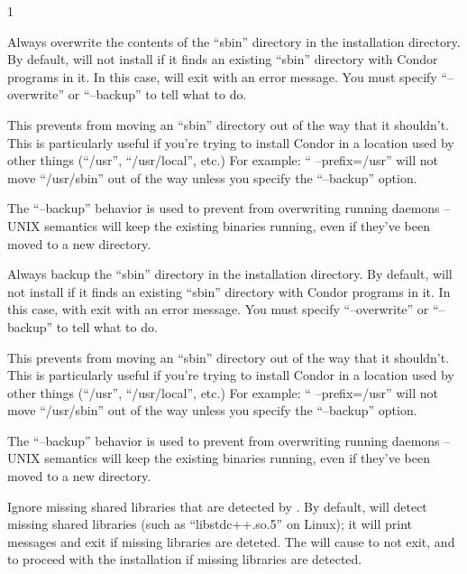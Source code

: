 \begin{ManPage}{\label{man-condor-configure}}{1}
\begin{Options}
	 {
	  Always overwrite the contents of the ``sbin'' directory in
	  the installation directory.  By default, 
	  will not install if it finds an existing ``sbin'' directory
	  with Condor programs in it.  In this case, 
	  will exit with an error message.  You must specify
	  ``--overwrite'' or ``--backup'' to tell 
	  what to do.

	  This prevents  from moving an ``sbin''
	  directory out of the way that it shouldn't.  This is
	  particularly useful if you're trying to install Condor in a
	  location used by other things (``/usr'', ``/usr/local'', etc.)
	  For example: `` --prefix=/usr'' will not move
	  ``/usr/sbin'' out of the way unless you specify the
	  ``--backup'' option.

	  The ``--backup'' behavior is used to
	  prevent  from overwriting running daemons --
	  UNIX semantics will keep the existing binaries running, even
	  if they've been moved to a new directory.}

	 {
	  Always backup the ``sbin'' directory in the installation
	  directory.  By default,  will not install if
	  it finds an existing ``sbin'' directory with Condor programs
	  in it.  In this case,  with exit with an
	  error message.  You must specify ``--overwrite'' or
	  ``--backup'' to tell  what to do.

	  This prevents  from moving an ``sbin''
	  directory out of the way that it shouldn't.  This is
	  particularly useful if you're trying to install Condor in a
	  location used by other things (``/usr'', ``/usr/local'', etc.)
	  For example: `` --prefix=/usr'' will not move
	  ``/usr/sbin'' out of the way unless you specify the
	  ``--backup'' option.

	  The ``--backup'' behavior is used to
	  prevent  from overwriting running daemons --
	  UNIX semantics will keep the existing binaries running, even
	  if they've been moved to a new directory. }

	 {
	  Ignore missing shared libraries that are detected by
	  .  By default,  will detect
	  missing shared libraries (such as ``libstdc++.so.5'' on
	  Linux); it will print messages and exit if missing libraries
	  are deteted.  The  will cause
	   to not exit, and to proceed with the
	  installation if missing libraries are detected.
	}


\end{Options}
\end{ManPage}
